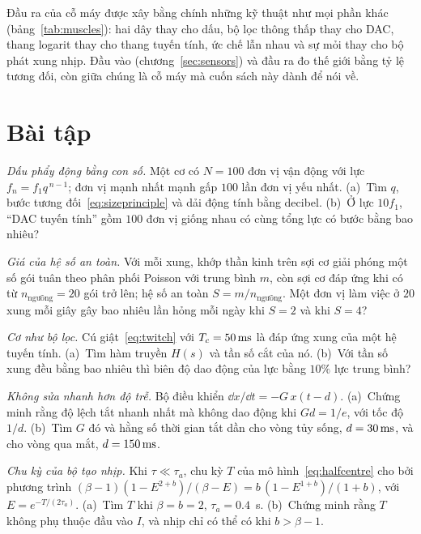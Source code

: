 Đầu ra của cỗ máy được xây bằng chính những kỹ thuật như mọi phần khác (bảng~\ref{tab:muscles}): hai dây thay cho dấu, bộ lọc thông thấp thay cho DAC, thang logarit thay cho thang tuyến tính, ức chế lẫn nhau và sự mỏi thay cho bộ phát xung nhịp. Đầu vào (chương~\ref{sec:sensors}) và đầu ra đo thế giới bằng tỷ lệ tương đối, còn giữa chúng là cỗ máy mà cuốn sách này dành để nói về.

\section{Bài tập}

\begin{exercise}[\lvlA]
\label{ex:13:1}
\emph{Dấu phẩy động bằng con số.} Một cơ có $N=100$ đơn vị vận động với lực $f_n=f_1q^{\,n-1}$; đơn vị mạnh nhất mạnh gấp $100$ lần đơn vị yếu nhất. (a)~Tìm $q$, bước tương đối~\eqref{eq:sizeprinciple} và dải động tính bằng decibel. (b)~Ở lực $10f_1$, ``DAC tuyến tính'' gồm $100$ đơn vị giống nhau có cùng tổng lực có bước bằng bao nhiêu?
\end{exercise}

\begin{exercise}[\lvlA]
\label{ex:13:2}
\emph{Giá của hệ số an toàn.} Với mỗi xung, khớp thần kinh trên sợi cơ giải phóng một số gói tuân theo phân phối Poisson với trung bình $m$, còn sợi cơ đáp ứng khi có từ $n_{\text{ngưỡng}}=20$ gói trở lên; hệ số an toàn $S=m/n_{\text{ngưỡng}}$. Một đơn vị làm việc ở $20$ xung mỗi giây gây bao nhiêu lần hỏng mỗi ngày khi $S=2$ và khi $S=4$?
\end{exercise}

\begin{exercise}[\lvlB]
\label{ex:13:3}
\emph{Cơ như bộ lọc.} Cú giật~\eqref{eq:twitch} với $T_c=50\,\text{ms}$ là đáp ứng xung của một hệ tuyến tính. (a)~Tìm hàm truyền $H(s)$ và tần số cắt của nó. (b)~Với tần số xung đều bằng bao nhiêu thì biên độ dao động của lực bằng $10\%$ lực trung bình?
\end{exercise}

\begin{exercise}[\lvlB]
\label{ex:13:4}
\emph{Không sửa nhanh hơn độ trễ.} Bộ điều khiển $\dd x/\dd t=-G\,x(t-d)$. (a)~Chứng minh rằng độ lệch tắt nhanh nhất mà không dao động khi $Gd=1/e$, với tốc độ $1/d$. (b)~Tìm $G$ đó và hằng số thời gian tắt dần cho vòng tủy sống, $d=30\,\text{ms}$, và cho vòng qua mắt, $d=150\,\text{ms}$.
\end{exercise}

\begin{exercise}[\lvlB]
\label{ex:13:5}
\emph{Chu kỳ của bộ tạo nhịp.} Khi $\tau\ll\tau_a$, chu kỳ $T$ của mô hình~\eqref{eq:halfcentre} cho bởi phương trình $(\beta-1)(1-E^{2+b})/(\beta-E)=b\,(1-E^{1+b})/(1+b)$, với $E=e^{-T/(2\tau_a)}$. (a)~Tìm $T$ khi $\beta=b=2$, $\tau_a=0.4$~s. (b)~Chứng minh rằng $T$ không phụ thuộc đầu vào $I$, và nhịp chỉ có thể có khi $b>\beta-1$.
\end{exercise}

